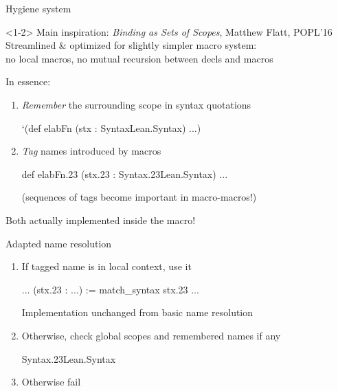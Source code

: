 \documentclass[t]{beamer}
\newcommand{\kit}[1]{\textcolor{KITgreen}{#1}}
\begin{document}
\begin{frame}[fragile]{Hygiene system}
  \begin{onlyenv}<1-2>
    Main inspiration: \emph{Binding as Sets of Scopes}, Matthew Flatt, POPL'16 \vfill
    \pause
    Streamlined \& optimized for slightly simpler macro system:\\
    no local macros, no mutual recursion between decls and macros
  \end{onlyenv}
  \pause
  In essence:
  \begin{enumerate}
  \item \emph{Remember} the surrounding scope in syntax quotations
\begin{leancode}
`(def elabFn{} (stx{} : Syntax{Lean.Syntax}) ...)
\end{leancode}
    \pause
  \item \emph{Tag} names introduced by macros
\begin{leancode}
def elabFn.23{} (stx.23{} : Syntax.23{Lean.Syntax}) ...
\end{leancode}
    (sequences of tags become important in macro-macros!)
  \end{enumerate}
  \vfill
  \pause
  Both actually implemented inside the  macro!
\end{frame}

\begin{frame}[fragile]{Adapted name resolution}
  \begin{enumerate}
  \item If tagged name is in local context, use it
\begin{leancode}
... (stx.23{} : ...) := match_syntax stx.23{} ...
\end{leancode}
    \kit{Implementation unchanged from basic name resolution}
    \pause
    \vfill
  \item Otherwise, check global scopes \kit{and remembered names if any}
\begin{leancode}
Syntax.23{Lean.Syntax}
\end{leancode}
  \pause
  \vfill
  \item Otherwise fail
  \end{enumerate}
  \vfill
\end{frame}
\end{document}

